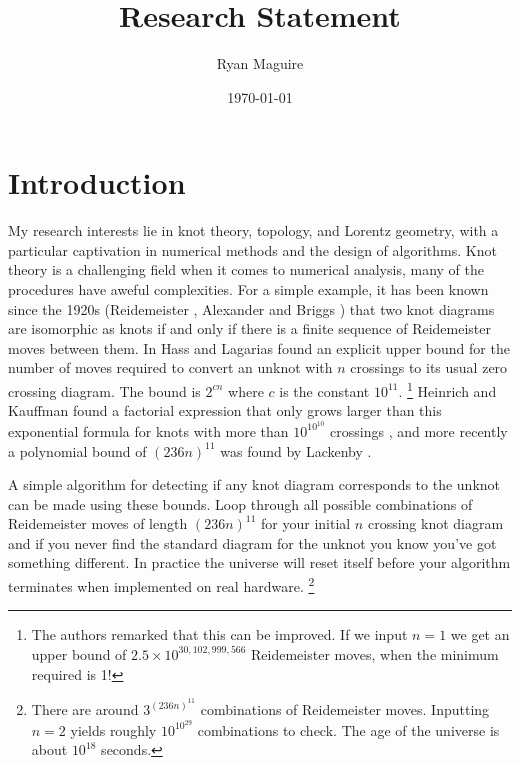\documentclass{article}
\title{Research Statement}
\author{Ryan Maguire}
\date{\today}
\theoremstyle{plain}
\begin{document}
    \maketitle
    \section{Introduction}
        My research interests lie in knot theory, topology, and Lorentz
        geometry, with a particular captivation in numerical methods and the
        design of algorithms. Knot theory is a challenging field when it comes
        to numerical analysis, many of the procedures have aweful complexities.
        For a simple example, it has been known since the 1920s
        (Reidemeister \cite{Reidemeister1927}, Alexander and Briggs
        \cite{AlexanderBriggs1926}) that two knot diagrams are isomorphic as
        knots if and only if there is a finite sequence of Reidemeister moves
        between them. In \cite{HassLagarias2001} Hass and Lagarias found an
        explicit upper bound for the number of moves required to convert an
        unknot with $n$ crossings to its usual zero crossing diagram. The
        bound is $2^{cn}$ where $c$ is the constant $10^{11}$.%
        \footnote{%
            The authors remarked that this can be improved.
            If we input $n=1$ we get an upper bound of
            $2.5\times{10}^{30,102,999,566}$ Reidemeister moves,
            when the minimum required is 1!
        }
        Heinrich and Kauffman found a factorial expression that only grows
        larger than this exponential formula for knots with more than
        $10^{10^{10}}$ crossings \cite{HenrichKauffman2010Unknotting}, and
        more recently a polynomial bound of
        $(236n)^{11}$ was found by Lackenby \cite{Lackenby2015Unknotting}.
        \par\hfill\par
        A simple algorithm for detecting if any knot diagram corresponds to the
        unknot can be made using these bounds. Loop through all possible
        combinations of Reidemeister moves of length $(236n)^{11}$ for your
        initial $n$ crossing knot diagram and if you never
        find the standard diagram for the unknot you know you've got something
        different. In practice the universe will reset itself before your
        algorithm terminates when implemented on real hardware.%
        \footnote{%
            There are around $3^{(236n)^{11}}$ combinations of Reidemeister
            moves. Inputting $n=2$ yields roughly $10^{10^{29}}$ combinations
            to check. The age of the universe is about $10^{18}$ seconds.
        }
\end{document}
